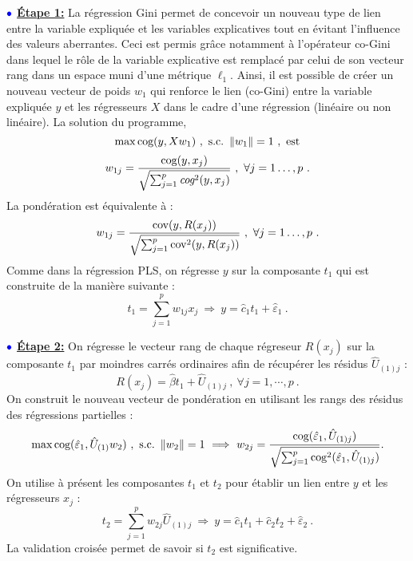 \medskip

$\bulle$ \underline{\textbf{Étape 1:}} La régression Gini permet de concevoir un nouveau type de lien entre la variable expliquée et les variables explicatives tout en évitant l'influence des valeurs aberrantes. Ceci est permis grâce notamment à l'opérateur co-Gini dans lequel le rôle de la variable explicative est remplacé par celui de son vecteur rang dans un espace muni d'une métrique $\ell_1$.  Ainsi, il est possible de créer un nouveau vecteur de poids $w_1$ qui renforce le lien (co-Gini) entre la variable expliquée $y$ et les régresseurs $X$ dans le cadre d'une régression (linéaire ou non linéaire).
\newline La solution du programme,
\[
\max \cog(y,X w_1) \ , \ \text{s.c.} \ \left\|w_1\right\|=1 \ , \ \text{est}
\]
\begin{equation}\notag
w_{1j} = \frac{\text{cog}(y,x_j)}{\sqrt{\sum_{j=1}^p \emph{cog}^2(y,x_j)}} \ , \ \forall j = 1\ldots,p \ .
\end{equation}
La pondération est équivalente à :
\begin{equation}\notag
w_{1j} = \frac{\text{cov}(y,R(x_j))}{\sqrt{\sum_{j=1}^p \text{cov}^2(y,R(x_j))}} \ , \ \forall j = 1\ldots,p \ .
\end{equation}
Comme dans la régression PLS, on régresse $y$ sur la composante $t_1$ qui est construite de la manière suivante :
\[
t_1 = \sum_{j=1}^p w_{1j}x_j \ \Longrightarrow \ y = \hat{c}_1 t_1 + \hat{\varepsilon}_1 \ .
\]

\medskip

$\bulle$ \underline{\textbf{Étape 2:}}  On régresse le vecteur rang de chaque régreseur $R(x_j)$ sur la composante $t_1$ par moindres carrés ordinaires afin de récupérer les résidus $\hat{U}_{(1)j}$ : 
\[
R(x_j) = \hat{\beta}t_1 + \hat{U}_{(1)j} \ , \ \forall j = 1,\cdots, p \ .
\]
On construit le nouveau vecteur de pondération en utilisant les rangs des résidus des régressions partielles :
\[
\mathop{\mathrm{max}}\limits \text{cog}(\hat{\varepsilon}_1,\hat{U}_{(1)} w_2) \ , \ \text{s.c.} \ \left\|w_2\right\|=1 \ \Longrightarrow \ w_{2j} = \frac{\text{cog}(\hat{\varepsilon}_1,\hat{U}_{(1)j})}{\sqrt{\sum_{j=1}^p \text{cog}^2(\hat{\varepsilon}_1,\hat{U}_{(1)j})}} .
\]
On utilise à présent les composantes $t_1$ et $t_2$ pour établir un lien entre $y$ et les régresseurs $x_j$ :
\[
t_2 = \sum^p_{j=1} w_{2j} \hat{U}_{(1)j} \ \Longrightarrow \ y = \hat{c}_1 t_1 + \hat{c}_2 t_2 + \hat{\varepsilon}_2 \ .
\]
La validation croisée permet de savoir si $t_2$ est significative.\\

